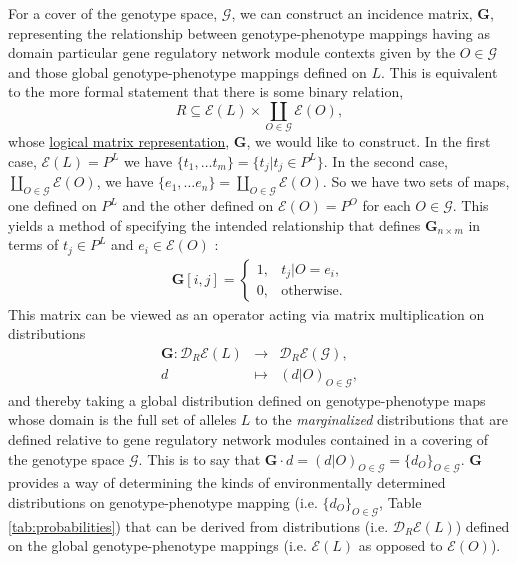 \documentclass[10pt]{article}
\begin{document}
For a cover of the genotype space, $\mathcal{G}$, we can construct an incidence matrix, $\mathbf{G}$, representing the relationship between genotype-phenotype mappings having as domain particular gene regulatory network module contexts given by the $O \in \mathcal{G}$ and those global genotype-phenotype mappings defined on $L$. This is equivalent to the more formal statement that there is some binary relation,
\begin{equation}
R \subseteq \mathcal{E}(L) \times \coprod_{O \in \mathcal{G}} \mathcal{E}(O),
\end{equation}
whose \href{http://en.wikipedia.org/wiki/Logical_matrix#Matrix_representation_of_a_relation}{logical matrix representation}, $\mathbf{G}$, we would like to construct. In the first case, $\mathcal{E}(L) = P^L$ we have $\{t_1, \ldots t_m\} = \{t_j | t_j \in P^L\}$. In the second case, $\coprod_{O \in \mathcal{G}} \mathcal{E}(O)$, we have $\{e_1, \ldots e_n\} = \coprod_{O \in \mathcal{G}} \mathcal{E}(O)$. So we have two sets of maps, one defined on $P^L$ and the other defined on $\mathcal{E}(O) = P^O$ for each $O \in \mathcal{G}$. This yields a method of specifying the intended relationship that defines $\mathbf{G}_{n \times m}$ in terms of $t_j \in P^L$ and $e_i \in \mathcal{E}(O)$ :
\begin{eqnarray}
\mathbf{G}[i,j] =
\begin{cases}
1, & t_j|O = e_i,\\
0, & \text{otherwise}.
\end{cases}
\end{eqnarray}
This matrix can be viewed as an operator acting via matrix multiplication on distributions
\begin{eqnarray*}
\mathbf{G} \colon \mathcal{D}_R\mathcal{E}(L) &\rightarrow& \mathcal{D}_R\mathcal{E}(\mathcal{G}),\\
d &\mapsto& (d|O)_{O \in \mathcal{G}},
\end{eqnarray*}
and thereby taking a global distribution defined on genotype-phenotype maps whose domain is the full set of alleles $L$ to the \emph{marginalized} distributions that are defined relative to gene regulatory network modules contained in a covering of the genotype space $\mathcal{G}$. This is to say that $\mathbf{G} \cdot d = (d|O)_{O \in \mathcal{G}} = \{d_O\}_{O \in \mathcal{G}}$. $\mathbf{G}$ provides a way of determining the kinds of environmentally determined distributions on genotype-phenotype mapping (i.e. $\{d_O\}_{O \in \mathcal{G}}$, Table \ref{tab:probabilities}) that can be derived from distributions (i.e. $\mathcal{D}_R \mathcal{E}(L)$) defined on the global genotype-phenotype mappings (i.e. $\mathcal{E}(L)$ as opposed to $\mathcal{E}(O)$).
\end{document}
